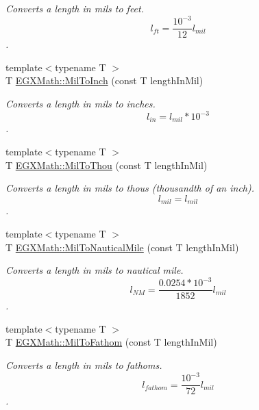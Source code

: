 \begin{DoxyCompactItemize}
\begin{DoxyCompactList}\small\item\em Converts a length in mils to feet. \[ l_{ft}= \frac{10^{-3}}{12} l_{mil} \]. \end{DoxyCompactList}\item 
{\footnotesize template$<$typename T $>$ }\\T \mbox{\hyperlink{group___e_g_x_math-_conversions-_length_conversions-_imperial-_mil-_imperial_ga70cc1592b6255e3d14562f09f4b9ab02}{E\+G\+X\+Math\+::\+Mil\+To\+Inch}} (const T length\+In\+Mil)
\begin{DoxyCompactList}\small\item\em Converts a length in mils to inches. \[ l_{in}= l_{mil} * 10^{-3} \]. \end{DoxyCompactList}\item 
{\footnotesize template$<$typename T $>$ }\\T \mbox{\hyperlink{group___e_g_x_math-_conversions-_length_conversions-_imperial-_mil-_imperial_gad56400e34744827dbf9b886f6261c0de}{E\+G\+X\+Math\+::\+Mil\+To\+Thou}} (const T length\+In\+Mil)
\begin{DoxyCompactList}\small\item\em Converts a length in mils to thous (thousandth of an inch). \[ l_{mil}= l_{mil} \]. \end{DoxyCompactList}\item 
{\footnotesize template$<$typename T $>$ }\\T \mbox{\hyperlink{group___e_g_x_math-_conversions-_length_conversions-_imperial-_mil-_nautical_ga1119f841677015f7cd73282f344fa257}{E\+G\+X\+Math\+::\+Mil\+To\+Nautical\+Mile}} (const T length\+In\+Mil)
\begin{DoxyCompactList}\small\item\em Converts a length in mils to nautical mile. \[ l_{NM}= \frac{0.0254 * 10^{-3}}{1852} l_{mil} \]. \end{DoxyCompactList}\item 
{\footnotesize template$<$typename T $>$ }\\T \mbox{\hyperlink{group___e_g_x_math-_conversions-_length_conversions-_imperial-_mil-_nautical_ga33f91cb317832899405279bc3fde4f3a}{E\+G\+X\+Math\+::\+Mil\+To\+Fathom}} (const T length\+In\+Mil)
\begin{DoxyCompactList}\small\item\em Converts a length in mils to fathoms. \[ l_{fathom}= \frac{10^{-3}}{72} l_{mil} \]. \end{DoxyCompactList}\item 

\end{DoxyCompactItemize}
